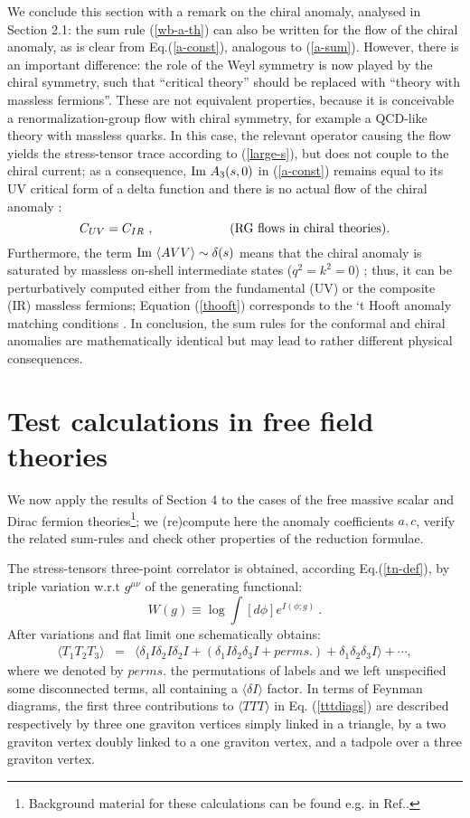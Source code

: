 \documentclass[11pt]{article}
\newcommand{\beq}{\begin{equation}}
\newcommand{\eeq}{\end{equation}}
\newcommand{\bea}{\begin{eqnarray}}
\newcommand{\eea}{\end{eqnarray}}
\def\Im{\hbox{\rm Im\ }}
\def\TTT{\bra TTT\ket}
\def\bra{\langle}
\def\ket{\rangle}
\begin{document}
We conclude this section with a remark on the chiral anomaly,
analysed in Section 2.1:
the sum rule (\ref{wb-a-th}) can also be written
for the flow of the chiral anomaly, as is clear from Eq.(\ref{a-const}),
analogous to (\ref{a-sum}). 
However, there is an important difference:
the role of the Weyl symmetry is now played by the chiral symmetry,
such that ``critical theory'' should be replaced with 
``theory with massless fermions''. 
These are not equivalent properties, because it is conceivable a 
renormalization-group flow with chiral symmetry, for example a QCD-like
theory with massless quarks. In this case, the relevant operator
causing the flow
yields the stress-tensor trace according to (\ref{large-s}), but does not
couple to the chiral current; as a consequence, 
$\Im A_3(s,0)$ in (\ref{a-const}) remains equal to its UV critical 
form of a delta function and there is no actual flow of the
chiral anomaly \cite{fsby}:
\beq
C_{UV}=C_{IR} \ ,\qquad\qquad\qquad{\rm (RG\ flows\ in\ chiral\ theories).}
\label{thooft}\eeq
Furthermore, the term $\Im \bra AVV\ket \sim\delta(s)$ 
means that the chiral anomaly
is saturated by massless on-shell intermediate states ($q^2=k^2=0$)
\cite{cole}; thus, it can be perturbatively computed either from 
the fundamental (UV) or the composite (IR) massless fermions;
Equation (\ref{thooft}) corresponds to the `t Hooft anomaly matching 
conditions \cite{fsby}.
In conclusion, the sum rules for the conformal and chiral anomalies are
mathematically identical but may lead to rather different physical 
consequences.

\setcounter{footnote}{1}

 
\section{Test calculations in free field theories}
 
We now apply the results of Section 4 to the cases of the free massive scalar
and Dirac fermion theories\footnote{Background material for these
calculations can be found e.g. in Ref.\cite{cfl}.};
we (re)compute here the anomaly coefficients $a, c$,
verify the related sum-rules and check other properties
of the reduction formulae.

The stress-tensors three-point correlator is obtained, 
according Eq.(\ref{tn-def}), by triple variation  w.r.t $g^{\mu \nu} $ of 
the generating functional:
\beq
W(g)\equiv \log \int [d\phi] e^{I(\phi;g)} \ .
\eeq 
After variations and   flat limit   one schematically obtains:
\bea
\bra T_1 T_2 T_3\ket
&=&
\bra  \delta_1 I \delta_2 I\delta_2 I 
      +\left(\delta_1 I \delta_2\delta_3 I + perms. \right) 
      +\delta_1 \delta_2\delta_3I\ket
+\cdots,
\label{tttdiags}\eea
where  we denoted by $perms.$ the permutations of labels and
we left unspecified some disconnected terms, all containing a 
$\bra \delta I\ket $ factor.
In terms of Feynman diagrams, the first 
three contributions to $\TTT$ in  Eq. (\ref{tttdiags}) 
are described respectively by three one graviton vertices
simply linked in a triangle, by
a two graviton vertex doubly linked to a one graviton vertex, and
a tadpole over a three graviton vertex.
\end{document}
